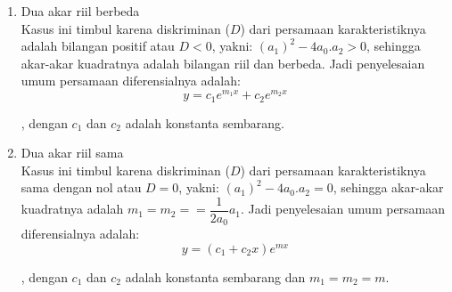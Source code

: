 \begin{enumerate}[1.]

	\item Dua akar riil berbeda	\\
	Kasus ini timbul karena diskriminan (\begin{math} D \end{math}) dari persamaan karakteristiknya adalah bilangan positif atau \begin{math} D< 0\end{math}, yakni: \begin{math} (a_1)^{2} - 4 a_0 . a_2 > 0 \end{math}, sehingga akar-akar kuadratnya adalah bilangan riil 		dan berbeda. Jadi penyelesaian umum persamaan diferensialnya adalah: \\ 

	\begin{equation}y = c_1 e^{m_1 x} + c_2 e^{m_2 x} \end{equation} 

	, dengan \begin{math} c_1 \end{math} dan \begin{math} c_2 \end{math} adalah konstanta sembarang.

	\item Dua akar riil sama \\
	Kasus ini timbul karena diskriminan (\begin{math} D \end{math}) dari persamaan karakteristiknya sama dengan nol atau \begin{math} D= 0\end{math}, yakni: \begin{math} (a_1)^{2} - 4 a_0 . a_2 = 0 \end{math}, sehingga akar-akar kuadratnya adalah \begin{math} m_1
	= m_2 = =\dfrac{1}{2 a_0} a_1 \end{math}. Jadi penyelesaian umum persamaan diferensialnya adalah: \\

	\begin{equation} y = (c_1 + c_2 x)e^{mx}\end{equation}

	, dengan  \begin{math} c_1 \end{math} dan \begin{math} c_2 \end{math} adalah konstanta sembarang dan \begin{math} m_1 = m_2 = m \end{math}.


\end{enumerate}
